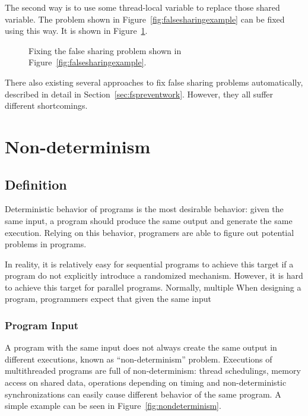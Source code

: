 The second way is to use some thread-local variable to replace those shared variable.
The problem shown in Figure~\ref{fig:falsesharingexample} can be fixed using this way. It is shown in Figure~\ref{fig:falsesharingexamplefix}. 

\begin{figure}[!ht]
{\centering
\fbox{
\subfigure{}
}
\caption{Fixing the false sharing problem shown in Figure~\ref{fig:falsesharingexample}.
\label{fig:falsesharingexamplefix}}
}
\end{figure}

There also existing several approaches to fix false sharing problems automatically, described in detail in Section~\ref{sec:fspreventwork}. However, they all suffer different shortcomings. 




\section{Non-determinism}

\subsection{Definition}
Deterministic behavior of programs is the most desirable behavior: given the same input, a program
should produce the same output and generate the same execution. Relying on this behavior, programers
are able to figure out potential problems in programs. 

In reality, it is relatively easy for sequential
programs to achieve this target if a program do not explicitly introduce a randomized mechanism. 
However, it is hard to achieve this target for parallel programs.
Normally, multiple   
When designing a program, programmers expect that given the same input 
\subsubsection{Program Input}
A program with the same input does not always create the same output in different executions,
known as ``non-determinism'' problem.
Executions of multithreaded programs are full of non-determinism: 
thread schedulings, memory access on shared data, operations depending on timing 
and non-deterministic synchronizations can easily cause different behavior of the same program.
A simple example can be seen in Figure~\ref{fig:nondeterminism}.

